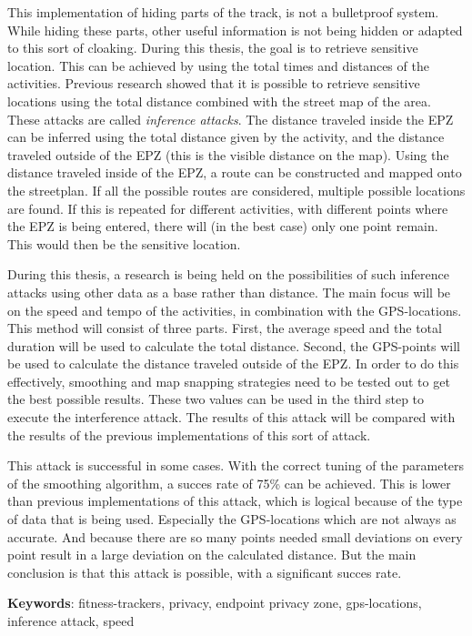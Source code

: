 This implementation of hiding parts of the track, is not a bulletproof system.
While hiding these parts, other useful information is not being hidden or
adapted to this sort of cloaking. During this thesis, the goal is to retrieve
sensitive location. This can be achieved by using the total times and distances
of the activities. Previous research showed that it is possible to retrieve
sensitive locations using the total distance combined with the street map of
the area. These attacks are called \textit{inference attacks}. The distance
traveled inside the EPZ can be inferred using the total distance given by the
activity, and the distance traveled outside of the EPZ (this is the visible
distance on the map). Using the distance traveled inside of the EPZ, a route
can be constructed and mapped onto the streetplan. If all the possible routes
are considered, multiple possible locations are found. If this is repeated for
different activities, with different points where the EPZ is being entered,
there will (in the best case) only one point remain. This would then be the
sensitive location.

During this thesis, a research is being held on the possibilities of such
inference attacks using other data as a base rather than distance. The main
focus will be on the speed and tempo of the activities, in combination with the
GPS-locations. This method will consist of three parts. First, the average
speed and the total duration will be used to calculate the total distance.
Second, the GPS-points will be used to calculate the distance traveled outside
of the \ac{EPZ}. In order to do this effectively, smoothing and map snapping
strategies need to be tested out to get the best possible results. These two
values can be used in the third step to execute the interference attack. The
results of this attack will be compared with the results of the previous
implementations of this sort of attack.

This attack is successful in some cases. With the correct tuning of the
parameters of the smoothing algorithm, a succes rate of 75\% can be achieved.
This is lower than previous implementations of this attack, which is logical
because of the type of data that is being used. Especially the GPS-locations
which are not always as accurate. And because there are so many points needed
small deviations on every point result in a large deviation on the calculated
distance. But the main conclusion is that this attack is possible, with a
significant succes rate.

\textbf{Keywords}: fitness-trackers, privacy, endpoint privacy zone, gps-locations, inference attack, speed